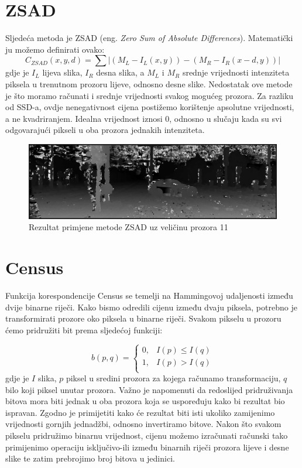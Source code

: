 \documentclass[utf8, zavrsni, numeric]{fer}
\begin{document}
\section{ZSAD}

Sljedeća metoda je ZSAD ({eng. \sl Zero Sum of Absolute Differences}). Matematički ju možemo definirati ovako:
\[
C_{ZSAD}(x, y, d) = \sum\lvert(M_L - I_L(x, y)) - (M_R - I_R(x - d, y))\rvert
\]
gdje je $I_L$ lijeva slika, $I_R$ desna slika, a $M_L$ i $M_R$ srednje vrijednosti intenziteta piksela u trenutnom prozoru lijeve, odnosno desne slike.
Nedostatak ove metode je što moramo računati i srednje vrijednosti svakog mogućeg prozora. Za razliku od SSD-a, ovdje nenegativnost cijena postižemo korištenje apsolutne vrijednosti, a ne kvadriranjem. Idealna vrijednost iznosi 0, odnosno u slučaju kada su svi odgovarajući pikseli u oba
prozora jednakih intenziteta.

\begin{figure}[htb]
  \centering
  \includegraphics[width=14cm]{img/local_000046_10_ZSAD_11_140_scaled.png}
  \caption{Rezultat primjene metode ZSAD uz veličinu prozora 11}
  \label{fig:ZSAD-KITTI}
\end{figure}

\section{Census}

Funkcija korespondencije Census se temelji na Hammingovoj udaljenosti između dvije binarne riječi. Kako bismo odredili cijenu između dvaju piksela, potrebno je transformirati
prozore oko piksela u binarne riječi. Svakom pikselu u prozoru ćemo pridružiti bit prema sljedećoj funkciji:

\[   
b(p, q) = 
     \begin{cases}
       0, & I(p) \leq I(q) \\
       1, & I(p) > I(q) \\
     \end{cases}
\]
gdje je $I$ slika, $p$ piksel u sredini prozora za kojega računamo transformaciju, $q$ bilo koji piksel unutar prozora. Važno je napomenuti da redoslijed pridruživanja bitova mora biti jednak u oba
prozora koja se uspoređuju kako bi rezultat bio ispravan. Zgodno je primijetiti kako će
rezultat biti isti ukoliko zamijenimo vrijednosti gornjih jednadžbi, odnosno invertiramo bitove. Nakon što svakom pikselu pridružimo binarnu vrijednost, cijenu možemo izračunati
računski tako primijenimo operaciju isključivo-ili između binarnih riječi prozora lijeve i desne slike te zatim prebrojimo broj bitova u jedinici.
\end{document}
